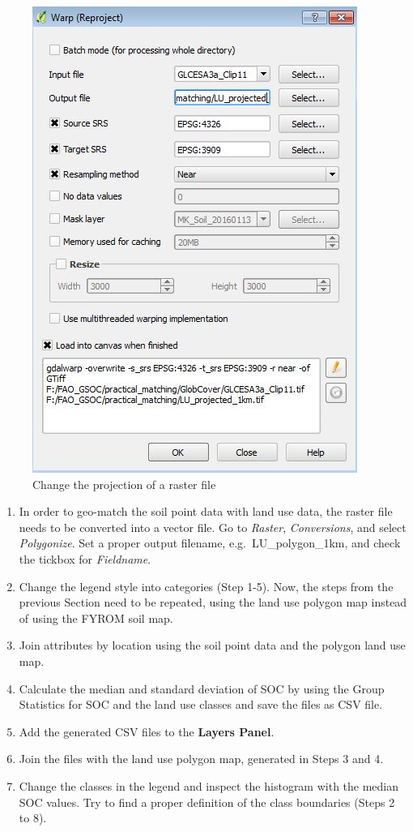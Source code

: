 \documentclass[10pt,b5paper,]{book}
\providecommand{\tightlist}{%
  \setlength{\itemsep}{0pt}\setlength{\parskip}{0pt}}
\theoremstyle{definition}
\theoremstyle{definition}
\theoremstyle{definition}
\theoremstyle{remark}
\begin{document}
\begin{figure}

{\centering \includegraphics[width=0.8\linewidth]{images/Conv_upscaling9} 

}

\caption{Change the projection of a raster file}\label{fig:changeproj}
\end{figure}

\begin{enumerate}
\def\labelenumi{\arabic{enumi}.}
\setcounter{enumi}{3}
\tightlist
\item
  In order to geo-match the soil point data with land use data, the
  raster file needs to be converted into a vector file. Go to
  \emph{Raster}, \emph{Conversions}, and select \emph{Polygonize}. Set a
  proper output filename, e.g.~LU\_polygon\_1km, and check the tickbox
  for \emph{Fieldname}.
\item
  Change the legend style into categories (Step 1-5). Now, the steps
  from the previous Section need to be repeated, using the land use
  polygon map instead of using the FYROM soil map.
\item
  Join attributes by location using the soil point data and the polygon
  land use map.
\item
  Calculate the median and standard deviation of SOC by using the Group
  Statistics for SOC and the land use classes and save the files as CSV
  file.
\item
  Add the generated CSV files to the \textbf{Layers Panel}.
\item
  Join the files with the land use polygon map, generated in Steps 3 and
  4.
\item
  Change the classes in the legend and inspect the histogram with the
  median SOC values. Try to find a proper definition of the class
  boundaries (Steps 2 to 8).
\end{enumerate}
\end{document}
